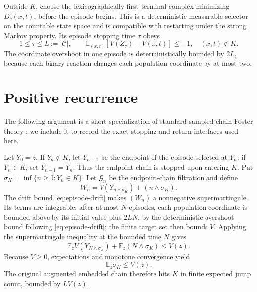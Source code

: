 Outside \(K\), choose the lexicographically first terminal complex minimizing
\(D_c(x,t)\), before the episode begins.  This is a deterministic measurable
selector on the countable state space and is compatible with restarting
under the strong Markov property.  Its episode stopping time \(\tau\) obeys
\begin{equation}\label{eq:episode-drift}
  1\le\tau\le L:=|\mathcal C|,
  \qquad
  \mathbb E_{(x,t)}[V(Z_\tau)-V(x,t)]\le-1,
  \quad (x,t)\notin K.
\end{equation}
The coordinate overshoot in one episode is deterministically bounded by
\(2L\), because each binary reaction changes each population coordinate by
at most two.

\section{Positive recurrence}\label{sec:recurrence}

The following argument is a short specialization of standard sampled-chain
Foster theory \citep{MeynTweedie2009}; we include it to record the exact
stopping and return interfaces used here.

Let \(Y_0=z\).  If \(Y_n\notin K\), let \(Y_{n+1}\) be the endpoint of the
episode selected at \(Y_n\); if \(Y_n\in K\), set \(Y_{n+1}=Y_n\).  Thus the
endpoint chain is stopped upon entering \(K\).  Put
\(
 \sigma_K=\inf\{n\ge0:Y_n\in K\}.
\)
Let \(\mathcal G_n\) be the endpoint-chain filtration and define
\[
 W_n=V(Y_{n\wedge\sigma_K})+(n\wedge\sigma_K).
\]
The drift bound \eqref{eq:episode-drift} makes \((W_n)\) a nonnegative
supermartingale.  Its terms are integrable: after at most \(N\) episodes, each
population coordinate is bounded above by its initial value plus \(2LN\), by
the deterministic overshoot bound following \eqref{eq:episode-drift}; the
finite target set then bounds \(V\).  Applying the supermartingale inequality
at the bounded time \(N\) gives
\begin{equation}\label{eq:stopped-drift}
  \mathbb E_zV(Y_{N\wedge\sigma_K})
  +\mathbb E_z(N\wedge\sigma_K)
  \le V(z).
\end{equation}
Because \(V\ge0\), expectations and monotone convergence yield
\begin{equation}\label{eq:episodes-to-K}
  \mathbb E_z\sigma_K\le V(z).
\end{equation}
The original augmented embedded chain therefore hits \(K\) in finite
expected jump count, bounded by \(L V(z)\).

